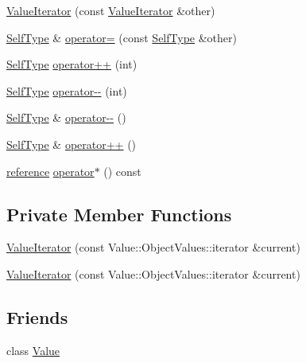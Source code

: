 \begin{DoxyCompactItemize}
\item 
\hyperlink{classJson_1_1ValueIterator_a7d5e58a9a4a553968acdf3064b39d21c}{Value\-Iterator} (const \hyperlink{classJson_1_1ValueIterator}{Value\-Iterator} \&other)
\item 
\hyperlink{classJson_1_1ValueIteratorBase_a9d2a940d03ea06d20d972f41a89149ee}{Self\-Type} \& \hyperlink{classJson_1_1ValueIterator_a263912ab48a278202312cfddf636bc71}{operator=} (const \hyperlink{classJson_1_1ValueIteratorBase_a9d2a940d03ea06d20d972f41a89149ee}{Self\-Type} \&other)
\item 
\hyperlink{classJson_1_1ValueIteratorBase_a9d2a940d03ea06d20d972f41a89149ee}{Self\-Type} \hyperlink{classJson_1_1ValueIterator_abcf4ddd994a010742cd4a436d65acd08}{operator++} (int)
\item 
\hyperlink{classJson_1_1ValueIteratorBase_a9d2a940d03ea06d20d972f41a89149ee}{Self\-Type} \hyperlink{classJson_1_1ValueIterator_a06d6a29d96caf6af324a53973159e12b}{operator-\/-\/} (int)
\item 
\hyperlink{classJson_1_1ValueIteratorBase_a9d2a940d03ea06d20d972f41a89149ee}{Self\-Type} \& \hyperlink{classJson_1_1ValueIterator_a811302a868518a0995a9def955df5720}{operator-\/-\/} ()
\item 
\hyperlink{classJson_1_1ValueIteratorBase_a9d2a940d03ea06d20d972f41a89149ee}{Self\-Type} \& \hyperlink{classJson_1_1ValueIterator_a92146c46f8249e2b2d12869e70cd4cee}{operator++} ()
\item 
\hyperlink{classJson_1_1ValueIterator_ae87929b4567aa00372cf602c43b57160}{reference} \hyperlink{classJson_1_1ValueIterator_aaa5be3457eedf0526a03b8a3b4c7c0a0}{operator$\ast$} () const 
\end{DoxyCompactItemize}
\subsection*{Private Member Functions}
\begin{DoxyCompactItemize}
\item 
\hyperlink{classJson_1_1ValueIterator_afb06ea21add440c78c27dc49570460a5}{Value\-Iterator} (const Value\-::\-Object\-Values\-::iterator \&current)
\item 
\hyperlink{classJson_1_1ValueIterator_afb06ea21add440c78c27dc49570460a5}{Value\-Iterator} (const Value\-::\-Object\-Values\-::iterator \&current)
\end{DoxyCompactItemize}
\subsection*{Friends}
\begin{DoxyCompactItemize}
\item 
class \hyperlink{classJson_1_1ValueIterator_a896c037a32087c5c20d97e64a1786880}{Value}
\end{DoxyCompactItemize}
